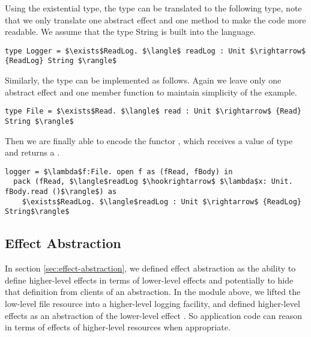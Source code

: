 Using the existential type, the type  can be translated to the following type, note that we only translate one abstract effect  and one method  to make the code more readable. We assume that the type String is built into the language.
\begin{lstlisting}[mathescape=true]
type Logger = $\exists$ReadLog. $\langle$ readLog : Unit $\rightarrow$ {ReadLog} String $\rangle$
\end{lstlisting}

Similarly, the  type can be implemented as follows. Again we leave only one abstract effect and one member function to maintain simplicity of the example.
\begin{lstlisting}[mathescape=true]
type File = $\exists$Read. $\langle$ read : Unit $\rightarrow$ {Read} String $\rangle$
\end{lstlisting}

Then we are finally able to encode the functor , which receives a value of type  and returns a . 

\begin{lstlisting}[mathescape=true]
logger = $\lambda$f:File. open f as (fRead, fBody) in 
  pack (fRead, $\langle$readLog $\hookrightarrow$ $\lambda$x: Unit. fBody.read ()$\rangle$) as
    $\exists$ReadLog. $\langle$readLog : Unit $\rightarrow$ {ReadLog} String$\rangle$
\end{lstlisting}

\subsection{Effect Abstraction}

In section  \ref{sec:effect-abstraction},  we defined effect abstraction as the ability to define higher-level effects in terms of lower-level effects and potentially to hide that definition from clients of an abstraction. In the  module above, we lifted the low-level file resource into a higher-level logging facility, and defined higher-level effects  as an abstraction of the lower-level effect . So application code can reason in terms of effects of higher-level resources when appropriate.



